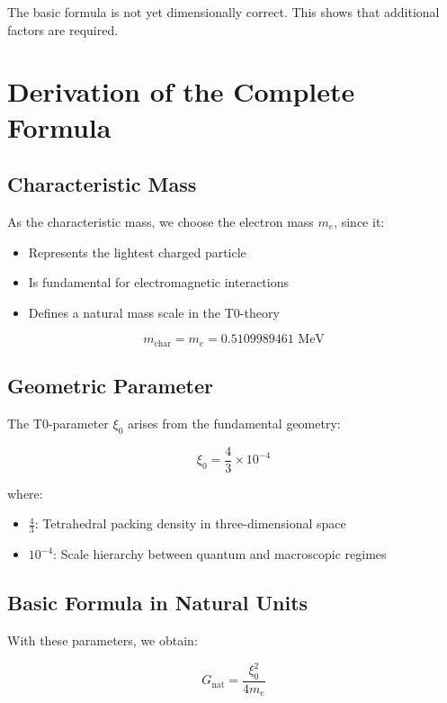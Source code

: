 \documentclass[12pt,a4paper]{article}
\begin{document}
	The basic formula is not yet dimensionally correct. This shows that additional factors are required.
	
	\section{Derivation of the Complete Formula}
	
	\subsection{Characteristic Mass}
	
	As the characteristic mass, we choose the electron mass $m_e$, since it:
	\begin{itemize}
		\item Represents the lightest charged particle
		\item Is fundamental for electromagnetic interactions
		\item Defines a natural mass scale in the T0-theory
	\end{itemize}
	
	\begin{equation}
		m_{\text{char}} = m_e = 0.5109989461 \text{ MeV}
	\end{equation}
	
	\subsection{Geometric Parameter}
	
	The T0-parameter $\xi_0$ arises from the fundamental geometry:
	
	\begin{equation}
		\xi_0 = \frac{4}{3} \times 10^{-4}
	\end{equation}
	
	where:
	\begin{itemize}
		\item $\frac{4}{3}$: Tetrahedral packing density in three-dimensional space
		\item $10^{-4}$: Scale hierarchy between quantum and macroscopic regimes
	\end{itemize}
	
	\subsection{Basic Formula in Natural Units}
	
	With these parameters, we obtain:
	
	\begin{equation}
		G_{\text{nat}} = \frac{\xi_0^2}{4 m_e}
		\label{eq:g_natural}
	\end{equation}
	
\end{document}
